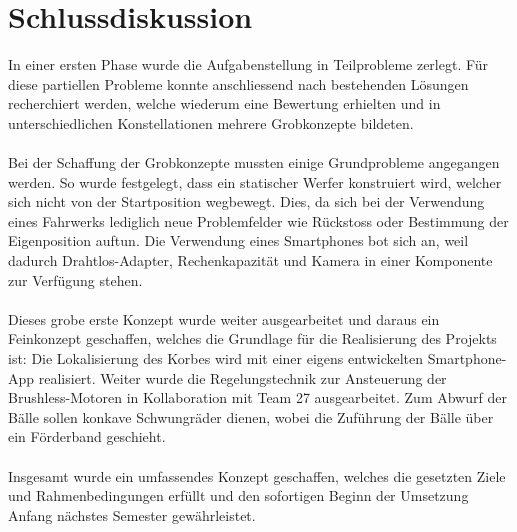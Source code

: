 \section{Schlussdiskussion}
In einer ersten Phase wurde die Aufgabenstellung in Teilprobleme zerlegt. Für diese partiellen Probleme konnte anschliessend nach bestehenden Lösungen recherchiert werden, welche wiederum eine Bewertung erhielten und in unterschiedlichen Konstellationen mehrere Grobkonzepte bildeten. \\
\\
Bei der Schaffung der Grobkonzepte mussten einige Grundprobleme angegangen werden. So wurde festgelegt, dass ein statischer Werfer konstruiert wird, welcher sich nicht von der Startposition wegbewegt. Dies, da sich bei der Verwendung eines Fahrwerks lediglich neue Problemfelder wie Rückstoss oder Bestimmung der Eigenposition auftun. Die Verwendung eines Smartphones bot sich an, weil dadurch Drahtlos-Adapter, Rechenkapazität und Kamera in einer Komponente zur Verfügung stehen. \\
\\
Dieses grobe erste Konzept wurde weiter ausgearbeitet und daraus ein Feinkonzept geschaffen, welches die Grundlage für die Realisierung des Projekts ist: Die Lokalisierung des Korbes wird mit einer eigens entwickelten Smartphone-App realisiert. Weiter wurde die Regelungstechnik zur Ansteuerung der Brushless-Motoren in Kollaboration mit Team 27 ausgearbeitet. Zum Abwurf der Bälle sollen konkave Schwungräder dienen, wobei die Zuführung der Bälle über ein Förderband geschieht. \\
\\
Insgesamt wurde ein umfassendes Konzept geschaffen, welches die gesetzten Ziele und Rahmenbedingungen erfüllt und den sofortigen Beginn der Umsetzung Anfang nächstes Semester gewährleistet.